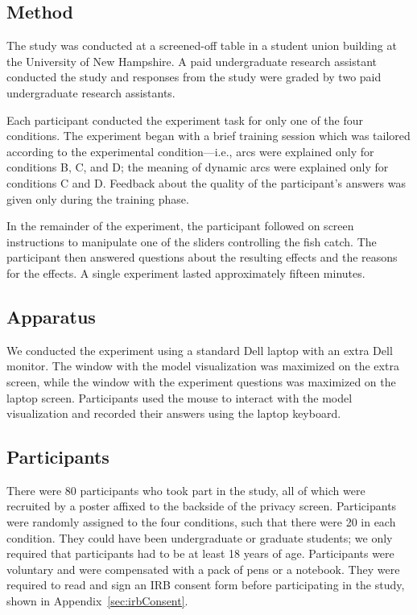 \subsection{Method}

The study was conducted at a screened-off table in a student union building at the University of New Hampshire.  A paid undergraduate research assistant conducted the study and responses from the study were graded by two paid undergraduate research assistants.

Each participant conducted the experiment task for only one of the four conditions.  The experiment began with a brief training session which was tailored according to the experimental condition---i.e., arcs were explained only for conditions B, C, and D; the meaning of dynamic arcs were explained only for conditions C and D.  Feedback about the quality of the participant's answers was given only during the training phase.  

In the remainder of the experiment, the participant followed on screen instructions to manipulate one of the sliders controlling the fish catch.  The participant then answered questions about the resulting effects and the reasons for the effects.  A single experiment lasted approximately fifteen minutes.

\subsection{Apparatus}

We conducted the experiment using a standard Dell laptop with an extra Dell monitor.  The window with the model visualization was maximized on the extra screen, while the window with the experiment questions was maximized on the laptop screen.  Participants used the mouse to interact with the model visualization and recorded their answers using the laptop keyboard.

\subsection{Participants} \label{sec:participants}

There were 80 participants who took part in the study, all of which were recruited by a poster affixed to the backside of the privacy screen.  Participants were randomly assigned to the four conditions, such that there were 20 in each condition.  They could have been undergraduate or graduate students; we only required that participants had to be at least 18 years of age.  Participants were voluntary and were compensated with a pack of pens or a notebook.  They were required to read and sign an IRB consent form before participating in the study, shown in Appendix~\ref{sec:irbConsent}.

